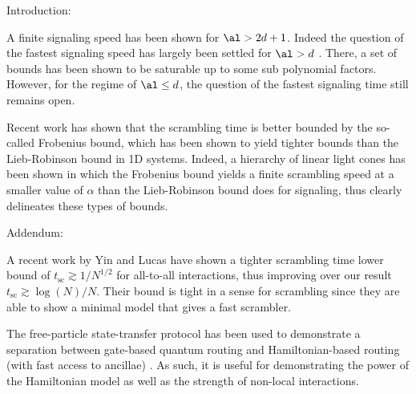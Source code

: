 Introduction:

A finite signaling speed has been shown for $\al > 2d+1$. Indeed the question of the fastest signaling speed has largely been settled for $\al > d$ \cite{Tran...}. There, a set of bounds has been shown to be saturable up to some sub polynomial factors. However, for the regime of $\al \le d$, the question of the fastest signaling time still remains open.

Recent work has shown that the scrambling time is better bounded by the so-called Frobenius bound, which has been shown to yield tighter bounds than the Lieb-Robinson bound in 1D systems. Indeed, a hierarchy of linear light cones has been shown in which the Frobenius bound yields a finite scrambling speed at a smaller value of $\alpha$ than the Lieb-Robinson bound does for signaling, thus clearly delineates these types of bounds.

Addendum:

A recent work by Yin and Lucas have shown a tighter scrambling time lower bound of $t_{\text{sc}}\gtrsim 1/N^{1/2}$ for all-to-all interactions, thus improving over our result $t_{\text{sc}}\gtrsim \log(N)/N$. Their bound is tight in a sense for scrambling since they are able to show a minimal model that gives a fast scrambler.

The free-particle state-transfer protocol has been used to demonstrate a separation between gate-based quantum routing and Hamiltonian-based routing (with fast access to ancillae) \cite{Schoute2022}. As such, it is useful for demonstrating the power of the Hamiltonian model as well as the strength of non-local interactions.
